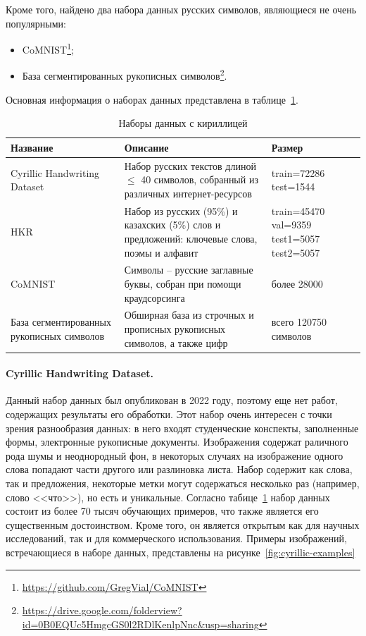 Кроме того, найдено два набора данных русских символов, являющиеся не очень популярными:
\begin{itemize}
    \item CoMNIST\footnote{\url{https://github.com/GregVial/CoMNIST}};
    \item База сегментированных рукописных символов\footnote{\url{https://drive.google.com/folderview?id=0B0EQUc5HmgcGS0l2RDlKenlpNnc&usp=sharing}}.
\end{itemize}

Основная информация о наборах данных представлена в таблице~\ref{tab:datasets}.

\begin{table}[h!]
    \centering
    \begin{tabular}{|p{4cm}|p{7cm}|p{3cm}|}
        \hline
        \textbf{Название} & \textbf{Описание} & \textbf{Размер} \\
        \hline
        \hline
        Cyrillic Handwriting Dataset & Набор русских текстов длиной $\leqslant$ 40 символов, собранный из различных интернет-ресурсов & train=72286 test=1544 \\
        \hline
        HKR & Набор из русских (95\%) и казахских (5\%) слов и предложений: ключевые слова, поэмы и алфавит & train=45470 val=9359 test1=5057 test2=5057 \\
        \hline
        CoMNIST & Символы -- русские заглавные буквы, собран при помощи краудсорсинга & более 28000 \\
        \hline
        База сегментированных рукописных символов & Обширная база из строчных и прописных рукописных символов, а также цифр & всего 120750 символов \\
        \hline
    \end{tabular}
    \caption{Наборы данных с кириллицей}
    \label{tab:datasets}
\end{table}

\paragraph{Cyrillic Handwriting Dataset.}{Данный набор данных был опубликован в 2022 году, поэтому еще нет работ, содержащих результаты его обработки.
Этот набор очень интересен с точки зрения разнообразия данных: в него входят студенческие конспекты, заполненные формы, электронные рукописные документы.
Изображения содержат раличного рода шумы и неоднородный фон, в некоторых случаях на изображение одного слова попадают части другого или разлиновка листа.
Набор содержит как слова, так и предложения, некоторые метки могут содержаться несколько раз (например, слово <<что>>), но есть и уникальные.
Согласно табице~\ref{tab:datasets} набор данных состоит из более 70 тысяч обучающих примеров, что также является его существенным достоинством.
Кроме того, он является открытым как для научных исследований, так и для коммерческого использования.
Примеры изображений, встречающиеся в наборе данных, представлены на рисунке~\ref{fig:cyrillic-examples}}

